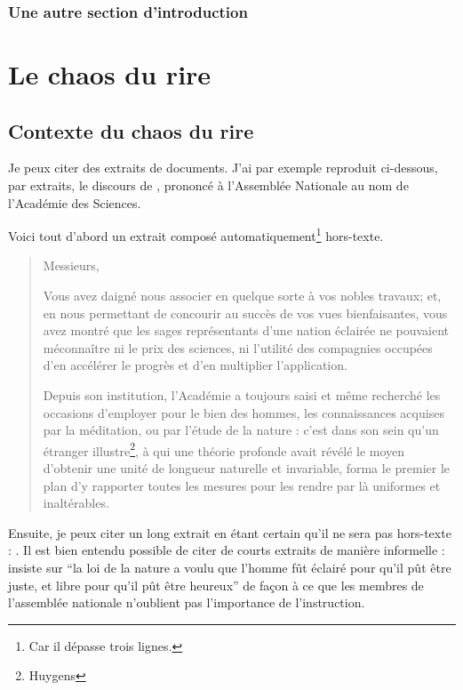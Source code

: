 \documentclass[12pt,space=onehalf,version=final]{yathesis}
\begin{document}
\section{Une autre section d'introduction}
\lipsum[37]
%
%
\part{Le chaos du rire}
%
\chapter{Contexte du chaos du rire}

Je peux citer des extraits de
documents. J'ai par exemple reproduit ci-dessous, par extraits, le discours de
\citeauthor{cond}, prononcé à l'Assemblée Nationale au nom de l'Académie des
Sciences.

Voici tout d'abord un extrait composé automatiquement\footnote{Car il dépasse
  trois lignes.} \og hors-texte\fg{}.
%
\blockcquote[pp.~508-509]{cond}{%
  Messieurs,

  Vous avez daigné nous associer en quelque sorte à vos nobles
  travaux; et, en nous permettant de concourir au succès de vos vues
  bienfaisantes, vous avez montré que les sages représentants d'une
  nation éclairée ne pouvaient méconnaître ni le prix des sciences, ni
  l'utilité des compagnies occupées d'en accélérer le progrès et d'en
  multiplier l'application.

  Depuis son institution, l'Académie a toujours saisi et même
  recherché les occasions d'employer pour le bien des hommes, les
  connaissances acquises par la méditation, ou par l'étude de la
  nature : c'est dans son sein qu'un étranger
  illustre\footnote{Huygens}, à qui une théorie profonde avait révélé
  le moyen d'obtenir une unité de longueur naturelle et invariable,
  forma le premier le plan d'y rapporter toutes les mesures pour les
  rendre par là uniformes et inaltérables.
}

Ensuite, je peux citer un long extrait en étant certain qu'il ne
sera pas \og hors-texte\fg{} :
. Il est bien entendu possible de citer de courts extraits
de manière informelle : \citeauthor{cond}
insiste sur \enquote{la loi de la nature a voulu que
  l'homme fût éclairé pour qu'il pût être juste, et libre pour qu'il
  pût être heureux} de façon à ce que les membres de l'assemblée
nationale n'oublient pas l'importance de l'instruction.
\end{document}
